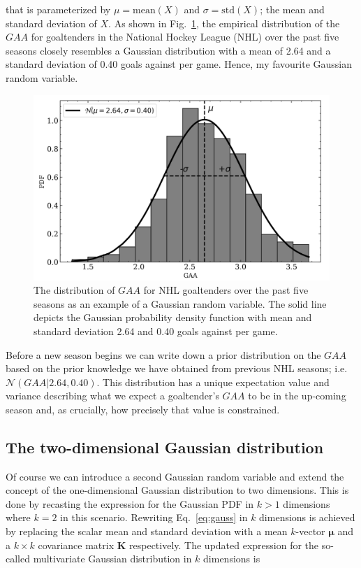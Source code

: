 \noindent that is parameterized by $\mu=\text{mean}(X)$ and $\sigma=\text{std}(X)$;
the mean and standard deviation of $X$. As shown in Fig.~\ref{fig:gaa1d}, the empirical
distribution of the $GAA$ for goaltenders in
the National Hockey League (NHL) over the past five seasons closely resembles a
Gaussian distribution with a mean of 2.64 and a standard deviation of 0.40 goals
against per game. Hence, my favourite Gaussian random variable. \\

\begin{figure}
  \centering
  \includegraphics[width=.8\textwidth]{figures/GAA1D.png}
  \caption[Gaussian random variable in one dimension.]
      {The distribution of $GAA$ for NHL goaltenders over the past five
    seasons as an example of a Gaussian random variable. The solid line depicts
    the Gaussian probability density function with mean and standard
    deviation 2.64 and 0.40 goals against per game.}
  \label{fig:gaa1d}
\end{figure}

Before a new season begins we can write down a prior distribution on the $GAA$
based on the prior knowledge we have obtained from previous NHL seasons; i.e.
$\mathcal{N}(GAA|2.64,0.40)$. This distribution has a unique expectation value and
variance describing what we expect a goaltender's $GAA$ to be in the
up-coming season and, as crucially, how precisely that value is constrained.

\subsection{The two-dimensional Gaussian distribution}
Of course we can introduce a second Gaussian random variable and extend the 
concept of the one-dimensional Gaussian distribution to two dimensions. This is done
by recasting the expression for the Gaussian PDF in $k>1$
dimensions where $k=2$ in this scenario. Rewriting Eq.~\ref{eq:gauss} in $k$
dimensions is achieved by replacing the scalar mean and standard deviation with a mean
$k$-vector $\boldsymbol{\mu}$ and a $k \times k$ covariance matrix $\mathbf{K}$
respectively. The updated expression for the so-called multivariate Gaussian
distribution in $k$ dimensions is

